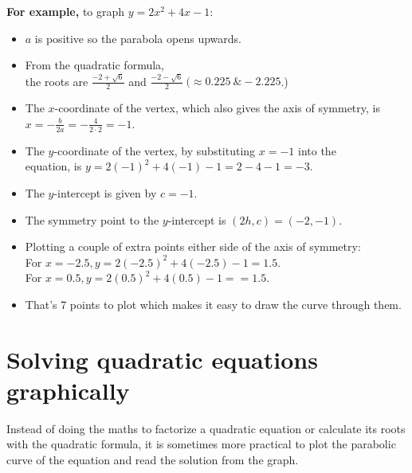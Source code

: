 \documentclass[12pt]{article}
\begin{document}
\textbf{For example,} to graph $y=2x^2+4x-1$:

\begin{itemize}
    \item $a$ is positive so the parabola opens upwards.
    \item From the quadratic formula,\\the roots are $\frac{-2+\sqrt{6}}{2}$ and $\frac{-2-\sqrt{6}}{2} \ (\approx 0.225 \ \& -2.225$.)
    \item The $x$-coordinate of the vertex, which also gives the axis of symmetry, is $x=-\frac{b}{2a}=-\frac{4}{2\cdot2}=-1$.
    \item The $y$-coordinate of the vertex, by substituting $x=-1$ into the\\equation, is $y=2(-1)^2+4(-1)-1=2-4-1=-3$.
    \item The $y$-intercept is given by $c=-1$.
    \item The symmetry point to the $y$-intercept is $(2h, c) = (-2,-1)$.
    \item Plotting a couple of extra points either side of the axis of symmetry:\\
    For $x=-2.5, y=2(-2.5)^2+4(-2.5)-1=1.5$.\\
    For $x= 0.5, y=2(0.5)^2+4(0.5)-1==1.5$.
    \item That's 7 points to plot which makes it easy to draw the curve through them.
\end{itemize}

\begin{center}
\end{center}

\section*{Solving quadratic equations graphically}
Instead of doing the maths to factorize a quadratic equation or calculate its roots with the quadratic formula, it is sometimes more practical to plot the parabolic curve of the equation and read the solution from the graph.\\
\end{document}
